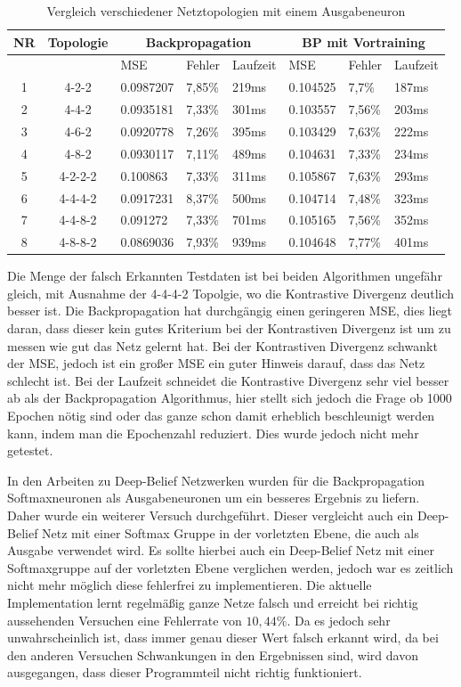 \documentclass[12pt]{article}
\begin{document}
\begin{table}[H]


\begin{tabularx}{\textwidth}{|c|c|X|X|X|X|X|X|}
	\hline
	NR & Topologie & \multicolumn{3}{|c|}{Backpropagation} & \multicolumn{3}{|c|}{BP mit Vortraining} \\\hline
	&&MSE& Fehler&Laufzeit&MSE& Fehler&Laufzeit
	\\\hline
	1&4-2-2&0.0987207&7,85\%&219ms&0.104525&7,7\%&187ms\\\hline
	2&4-4-2&0.0935181&7,33\%&301ms&0.103557&7,56\%&203ms\\\hline
	3&4-6-2&0.0920778&7,26\%&395ms&0.103429&7,63\%&222ms\\\hline
	4&4-8-2&0.0930117&7,11\%&489ms&0.104631&7,33\%&234ms\\\hline
	5&4-2-2-2&0.100863&7,33\%&311ms&0.105867&7,63\%&293ms\\\hline
	6&4-4-4-2&0.0917231&8,37\%&500ms&0.104714&7,48\%&323ms\\\hline
	7&4-4-8-2&0.091272&7,33\%&701ms&0.105165&7,56\%&352ms\\\hline
	8&4-8-8-2&0.0869036&7,93\%&939ms&0.104648&7,77\%&401ms\\\hline
	\end{tabularx}
	\caption{Vergleich verschiedener Netztopologien mit einem Ausgabeneuron}
	\label{sigmoid}
	\end{table}
	
	Die Menge der falsch Erkannten Testdaten ist bei beiden Algorithmen ungefähr gleich, mit Ausnahme der 4-4-4-2 Topolgie, wo die Kontrastive Divergenz deutlich besser ist. Die Backpropagation hat durchgängig einen geringeren MSE, dies liegt daran, dass dieser kein gutes Kriterium bei der Kontrastiven Divergenz ist um zu messen wie gut das Netz gelernt hat. Bei der Kontrastiven Divergenz schwankt der MSE, jedoch ist ein großer MSE ein guter Hinweis darauf, dass das Netz schlecht ist. Bei der Laufzeit schneidet die Kontrastive Divergenz sehr viel besser ab als der Backpropagation Algorithmus, hier stellt sich jedoch die Frage ob 1000 Epochen nötig sind oder das ganze schon damit erheblich beschleunigt werden kann, indem man die Epochenzahl reduziert. Dies wurde jedoch nicht mehr getestet.  
\newline	

In den Arbeiten zu Deep-Belief Netzwerken wurden für die Backpropagation Softmaxneuronen als Ausgabeneuronen um ein besseres Ergebnis zu liefern. Daher wurde ein weiterer Versuch durchgeführt. Dieser vergleicht auch ein Deep-Belief Netz mit einer Softmax Gruppe in der vorletzten Ebene, die auch als Ausgabe verwendet wird. Es sollte hierbei auch ein Deep-Belief Netz mit einer Softmaxgruppe auf der vorletzten Ebene verglichen werden, jedoch war es zeitlich nicht mehr möglich diese fehlerfrei zu implementieren. Die aktuelle Implementation lernt regelmäßig ganze Netze falsch und erreicht bei richtig aussehenden Versuchen eine Fehlerrate von $10,44\%$. Da es jedoch sehr unwahrscheinlich ist, dass immer genau dieser Wert falsch erkannt wird, da bei den anderen Versuchen Schwankungen in den Ergebnissen sind, wird davon ausgegangen, dass dieser Programmteil nicht richtig funktioniert.
\end{document}
